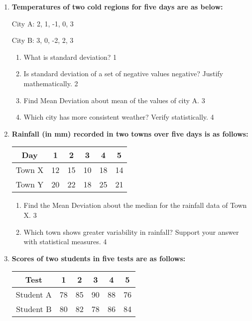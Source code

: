 \documentclass[a4paper,oneside]{book}
\begin{document}
\begin{enumerate}
    \item
  \textbf{Temperatures of two cold regions for five days are as below:}

    \begin{center}

    City A: 2, 1, -1, 0, 3

    City B: 3, 0, -2, 2, 3
    
    \end{center}
  \begin{enumerate}
    \item
	What is standard deviation? \hfill 1
    \item
	Is standard deviation of a set of negative values negative? Justify mathematically. \hfill 2
    \item  
	Find Mean Deviation about mean of the values of city A.  \hfill 3
    \item
	Which city has more consistent weather? Verify statistically. \hfill 4
\end{enumerate}

\item  
  \textbf{Rainfall (in mm) recorded in two towns over five days is as follows:}

\begin{table}[h]
\centering
\begin{tabular}{c|ccccc}
Day     & 1  & 2  & 3  & 4  & 5  \\ \hline
Town X  & 12 & 15 & 10 & 18 & 14 \\
Town Y  & 20 & 22 & 18 & 25 & 21
\end{tabular}
\end{table}


  \begin{enumerate}
    \item  
	Find the Mean Deviation about the median for the rainfall data of Town X.  \hfill 3  
    \item  
	Which town shows greater variability in rainfall? Support your answer with statistical measures.  \hfill 4  
\end{enumerate}

\item  
  \textbf{Scores of two students in five tests are as follows:}

\begin{table}[h]
\centering
\begin{tabular}{c|ccccc}
Test     & 1  & 2  & 3  & 4  & 5  \\ \hline
Student A  & 78 & 85 & 90 & 88 & 76 \\ 
Student B  & 80 & 82 & 78 & 86 & 84
\end{tabular}
\end{table}


\end{enumerate}
\end{document}
